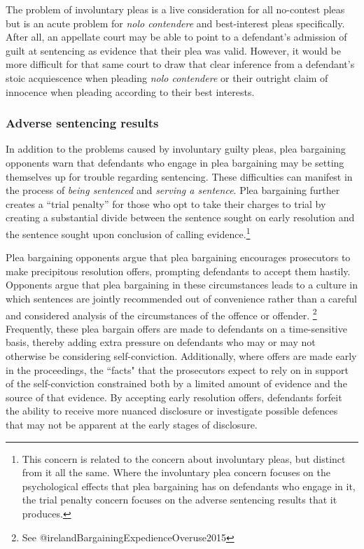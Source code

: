 The problem of involuntary pleas is a live consideration for all no-contest pleas but is an acute problem for \textit{nolo contendere} and best-interest pleas specifically. After all, an appellate court may be able to point to a defendant's admission of guilt at sentencing as evidence that their plea was valid. However, it would be more difficult for that same court to draw that clear inference from a defendant's stoic acquiescence when pleading \textit{nolo contendere} or their outright claim of innocence when pleading according to their best interests.

\subsubsection{Adverse sentencing results}

In addition to the problems caused by involuntary guilty pleas, plea bargaining opponents warn that defendants who engage in plea bargaining may be setting themselves up for trouble regarding sentencing. These difficulties can manifest in the process of \textit{being sentenced} and \textit{serving a sentence}. Plea bargaining further creates a ``trial penalty'' for those who opt to take their charges to trial by creating a substantial divide between the sentence sought on early resolution and the sentence sought upon conclusion of calling evidence.\footnote{This concern is related to the concern about involuntary pleas, but distinct from it all the same. Where the involuntary plea concern focuses on the psychological effects that plea bargaining has on defendants who engage in it, the trial penalty concern focuses on the adverse sentencing results that it produces.}

Plea bargaining opponents argue that plea bargaining encourages prosecutors to make precipitous resolution offers, prompting defendants to accept them hastily. Opponents argue that plea bargaining in these circumstances leads to a culture in which sentences are jointly recommended out of convenience rather than a careful and considered analysis of the circumstances of the offence or offender. \footnote{See @irelandBargainingExpedienceOveruse2015} Frequently, these plea bargain offers are made to defendants on a time-sensitive basis, thereby adding extra pressure on defendants who may or may not otherwise be considering self-conviction. Additionally, where offers are made early in the proceedings, the ``facts" that the prosecutors expect to rely on in support of the self-conviction constrained both by a limited amount of evidence and the source of that evidence. By accepting early resolution offers, defendants forfeit the ability to receive more nuanced disclosure or investigate possible defences that may not be apparent at the early stages of disclosure.

